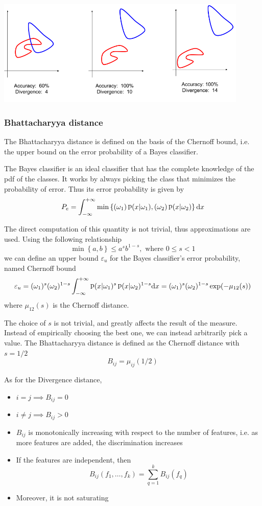 \documentclass[oneside,onecolumn]{report}
\newcommand{\eps}{\varepsilon}
\DeclareMathOperator*{\pdf}{p}
\let\P\relax
\DeclareMathOperator*{\P}{P}
\begin{document}
\begin{center}
    \includegraphics[width=12cm]{non_sasturating_divergence.png}
\end{center}

\subsubsection{Bhattacharyya distance}

The Bhattacharyya distance is defined on the basis of the Chernoff bound, i.e. the upper bound on the error probability of a Bayes classifier.

The Bayes classifier is an ideal classifier that has the complete knowledge of the pdf of the classes.
It works by always picking the class that minimizes the probability of error.
Thus its error probability is given by
$$ P_e = \int_{-\infty}^{+\infty} \min \left\{ \P(\omega_1) \pdf(x | \omega_1), \P(\omega_2) \pdf(x | \omega_2) \right\} \dd x $$

The direct computation of this quantity is not trivial, thus approximations are used.
Using the following relationship
$$ \min \left\{ a, b \right\} \leq a^s b^{1 - s}, \text{ where } 0 \leq s < 1 $$
we can define an upper bound $\eps_u$ for the Bayes classifier's error probability, named Chernoff bound
$$ \eps_u = \P(\omega_1)^s \P(\omega_2)^{1 - s} \int_{-\infty}^{+\infty} \pdf(x | \omega_1)^s \pdf(x | \omega_2)^{1 - s} \dd x =  \P(\omega_1)^s \P(\omega_2)^{1 - s} \exp( -\mu_{12}(s)) $$
where $\mu_{12}(s)$ is the Chernoff distance.

The choice of $s$ is not trivial, and greatly affects the result of the measure.
Instead of empirically choosing the best one, we can instead arbitrarily pick a value.
The Bhattacharyya distance is defined as the Chernoff distance with $s = 1/2$
$$ B_{i j} = \mu_{i j}(1/2) $$

As for the Divergence distance,
\begin{itemize}
    \item $i = j \implies B_{i j} = 0$
    \item $i \neq j \implies B_{i j} > 0$
    \item $B_{i j}$ is monotonically increasing with respect to the number of features, i.e. as more features are added, the discrimination increases
    \item If the features are independent, then
    $$ B_{i j}(f_1, \dots, f_k) = \sum_{q = 1}^k B_{i j}(f_q) $$
    \item Moreover, it is not saturating
\end{itemize}
\end{document}
